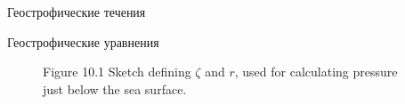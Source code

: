 \begin{chapter}{Геострофические течения}
\begin{section}{Геострофические уравнения}
\begin{figure}[h!]
\caption{Figure 10.1 Sketch defining $\zeta$ and $r$, used for
calculating pressure just below the sea surface.}
\label{fig:surfacesketch}
\end{figure}
%
%
\end{section}


\end{chapter}
